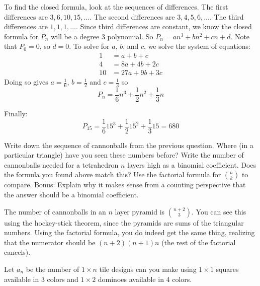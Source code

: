 \documentclass[11pt]{exam}
\begin{document}
\begin{questions}
\begin{solution}
	  	To find the closed formula, look at the sequences of differences.  The first differences are $3, 6, 10, 15, \ldots$.  The second differences are $3, 4, 5, 6, \ldots$.  The third differences are $1,1,1,\ldots$.  Since third differences are constant, we know the closed formula for $P_n$ will be a degree 3 polynomial.  So $P_n = an^3 + b n^2 + cn + d$.  Note that $P_0 = 0$, so $d = 0$.  To solve for $a$, $b$, and $c$, we solve the system of equations:
	  \begin{align*}
	    1 & = a + b + c \\
	    4 & = 8a+ 4b + 2c \\
	    10 & = 27a + 9b + 3c
	  \end{align*}
	  Doing so gives $a = \frac{1}{6}$, $b = \frac{1}{2}$ and $c = \frac{1}{3}$ so
	  \[P_n = \frac{1}{6}n^3 + \frac{1}{2} n^2 + \frac{1}{3} n\]

	Finally:
	  \[P_{15} = \frac{1}{6}15^3 + \frac{1}{2} 15^2 + \frac{1}{3} 15 = 680\]
	\end{solution}


	\question[4] Write down the sequence of cannonballs from the previous question.  Where (in a particular triangle) have you seen these numbers before?  Write the number of cannonballs needed for a tetrahedron $n$ layers high as a binomial coefficient.  Does the formula you found above match this?  Use the factorial formula for $\binom{n}{k}$ to compare.  Bonus: Explain why it makes sense from a counting perspective that the answer should be a binomial coefficient.

  \begin{solution}
    The number of cannonballs in an $n$ layer pyramid is $\binom{n+2}{3}$.  You can see this using the hockey-stick theorem, since the pyramids are sums of the triangular numbers.  Using the factorial formula, you do indeed get the same thing, realizing that the numerator should be $(n+2)(n+1)n$ (the rest of the factorial cancels).
  \end{solution}


	\question Let $a_n$ be the number of  $1 \times n$ tile designs can you make using $1 \times 1$ squares available in 3 colors and $1 \times 2$ dominoes available in 4 colors.
\end{questions}
\end{document}
